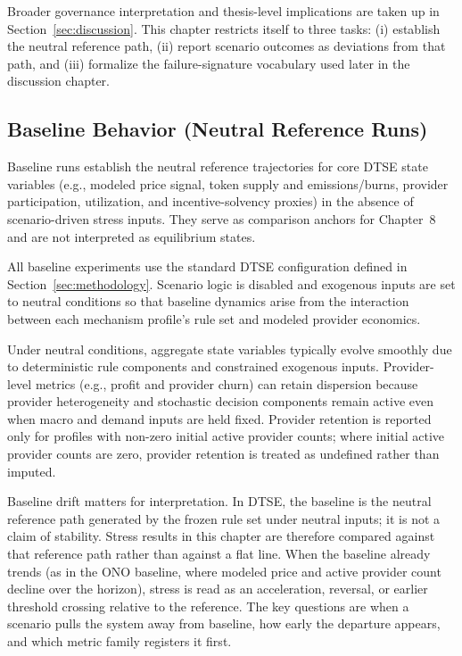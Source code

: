 Broader governance interpretation and thesis-level implications are taken up in Section~\ref{sec:discussion}. This chapter restricts itself to three tasks: (i) establish the neutral reference path, (ii) report scenario outcomes as deviations from that path, and (iii) formalize the failure-signature vocabulary used later in the discussion chapter.

\subsection{Baseline Behavior (Neutral Reference Runs)}
\label{baseline-behavior-sanity-check}
Baseline runs establish the neutral reference trajectories for core DTSE state variables (e.g., modeled price signal, token supply and emissions/burns, provider participation, utilization, and incentive-solvency proxies) in the absence of scenario-driven stress inputs. They serve as comparison anchors for Chapter~8 and are not interpreted as equilibrium states.

All baseline experiments use the standard DTSE configuration defined in Section~\ref{sec:methodology}. Scenario logic is disabled and exogenous inputs are set to neutral conditions so that baseline dynamics arise from the interaction between each mechanism profile's rule set and modeled provider economics.

Under neutral conditions, aggregate state variables typically evolve smoothly due to deterministic rule components and constrained exogenous inputs. Provider-level metrics (e.g., profit and provider churn) can retain dispersion because provider heterogeneity and stochastic decision components remain active even when macro and demand inputs are held fixed. Provider retention is reported only for profiles with non-zero initial active provider counts; where initial active provider counts are zero, provider retention is treated as undefined rather than imputed.

Baseline drift matters for interpretation. In DTSE, the baseline is the neutral reference path generated by the frozen rule set under neutral inputs; it is not a claim of stability. Stress results in this chapter are therefore compared against that reference path rather than against a flat line. When the baseline already trends (as in the ONO baseline, where modeled price and active provider count decline over the horizon), stress is read as an acceleration, reversal, or earlier threshold crossing relative to the reference. The key questions are when a scenario pulls the system away from baseline, how early the departure appears, and which metric family registers it first.

